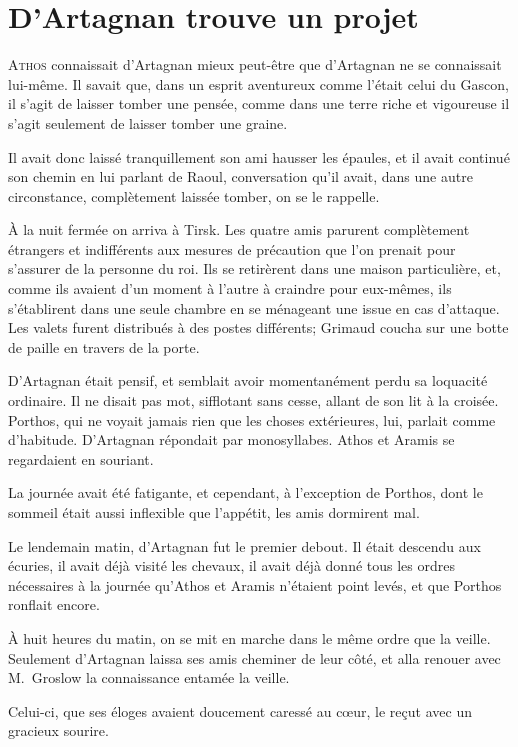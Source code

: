 \chapter{D'Artagnan trouve un projet}

\lettrine{A}{thos} connaissait d'Artagnan mieux peut-être que d'Artagnan ne se connaissait lui-même. Il savait que, dans un esprit aventureux comme l'était celui du Gascon, il s'agit de laisser tomber une pensée, comme dans une terre riche et vigoureuse il s'agit seulement de laisser tomber une graine.

Il avait donc laissé tranquillement son ami hausser les épaules, et il avait continué son chemin en lui parlant de Raoul, conversation qu'il avait, dans une autre circonstance, complètement laissée tomber, on se le rappelle.

À la nuit fermée on arriva à Tirsk. Les quatre amis parurent complètement étrangers et indifférents aux mesures de précaution que l'on prenait pour s'assurer de la personne du roi. Ils se retirèrent dans une maison particulière, et, comme ils avaient d'un moment à l'autre à craindre pour eux-mêmes, ils s'établirent dans une seule chambre en se ménageant une issue en cas d'attaque. Les valets furent distribués à des postes différents; Grimaud coucha sur une botte de paille en travers de la porte.

D'Artagnan était pensif, et semblait avoir momentanément perdu sa loquacité ordinaire. Il ne disait pas mot, sifflotant sans cesse, allant de son lit à la croisée. Porthos, qui ne voyait jamais rien que les choses extérieures, lui, parlait comme d'habitude. D'Artagnan répondait par monosyllabes. Athos et Aramis se regardaient en souriant.

La journée avait été fatigante, et cependant, à l'exception de Porthos, dont le sommeil était aussi inflexible que l'appétit, les amis dormirent mal.

Le lendemain matin, d'Artagnan fut le premier debout. Il était descendu aux écuries, il avait déjà visité les chevaux, il avait déjà donné tous les ordres nécessaires à la journée qu'Athos et Aramis n'étaient point levés, et que Porthos ronflait encore.

À huit heures du matin, on se mit en marche dans le même ordre que la veille. Seulement d'Artagnan laissa ses amis cheminer de leur côté, et alla renouer avec M.~Groslow la connaissance entamée la veille.

Celui-ci, que ses éloges avaient doucement caressé au cœur, le reçut avec un gracieux sourire.

